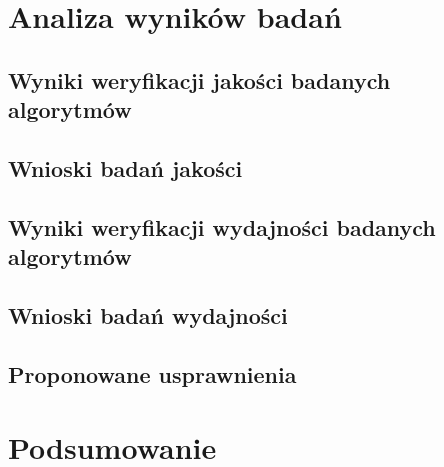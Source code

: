 \chapter{Analiza wyników badań}\label{Chapter_AnalizaRezultatow}

  \section{Wyniki weryfikacji jakości badanych algorytmów}\label{Section_Quality}

  \section{Wnioski badań jakości}\label{Section_QualityWnioski}

  \section{Wyniki weryfikacji wydajności badanych algorytmów}\label{Section_Performance}

  \section{Wnioski badań wydajności}\label{Section_PerformanceWnioski}

  \section{Proponowane usprawnienia}\label{Section_Usprawnienia}

\chapter{Podsumowanie}\label{Section_Podsumowanie}